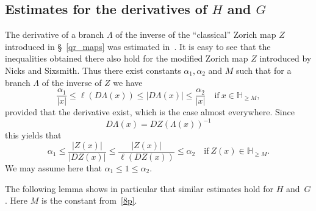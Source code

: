 \documentclass[12pt,a4paper]{amsart}
\theoremstyle{plain}
\theoremstyle{definition}
\theoremstyle{remark}
\def\H{\mathbb H}
\numberwithin{equation}{section}
\begin{document}
\subsection{Estimates for the derivatives of \texorpdfstring{$H$}{H} and \texorpdfstring{$G$}{G}} \label{derivatives}
The derivative of a branch $\Lambda$ of the inverse of the ``classical'' Zorich
map $Z$ introduced in \S~\ref{qr_maps} was estimated
in~\cite[inequalities (2.6) and (2.7)]{Bergweiler2010}. It is easy 
to see that the inequalities obtained there also hold for the modified 
Zorich map $Z$ introduced by Nicks and Sixsmith.
Thus there exist constants $\alpha_1,\alpha_2$ and $M$ such that 
for a branch $\Lambda$  of the inverse of $Z$ we have 
\begin{equation}\label{8n}
\frac{\alpha_1}{|x|}
\leq 
\ell(D\Lambda(x))
\leq 
\left|D\Lambda(x)\right|\leq\frac{\alpha_2}{|x|} 
\quad\text{if} \ x\in\H_{\geq M},
\end{equation}
provided that the derivative exist, which is the case almost everywhere. Since
\begin{equation}\label{8o}
D\Lambda(x)=DZ(\Lambda(x))^{-1}
\end{equation}
this yields that 
\begin{equation}\label{8p}
\alpha_1\leq \frac{|Z(x)|}{|DZ(x)|}\leq \frac{|Z(x)|}{\ell(DZ(x))}\leq \alpha_2
\quad\text{if} \ Z(x)\in\H_{\geq M}.
\end{equation}
We may assume here that $\alpha_1\leq 1\leq \alpha_2$.

The following lemma shows in particular that similar estimates hold for $H$ and~$G$.
Here $M$ is the constant from~\eqref{8p}.
\end{document}
